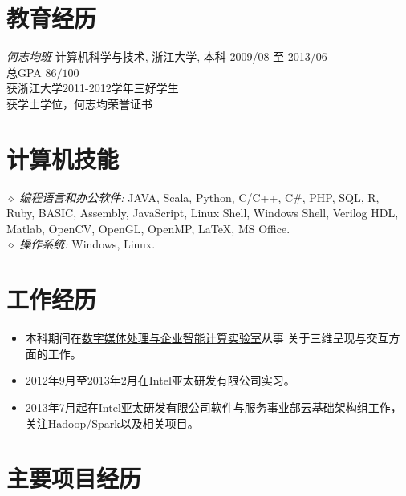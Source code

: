 \documentclass[line,margin]{res}
\begin{document}
\address{联系电话:\sl 15216861267}
\address{E-mail:\sl me@daoyuan.wang}


\begin{resume}

\section{教育经历} {\sl 何志均班} 计算机科学与技术, 浙江大学, 本科 \hfill 2009/08 至 2013/06\\
                总GPA $86/100$\\
                获浙江大学2011-2012学年三好学生\\
                获学士学位，何志均荣誉证书\\

\section{计算机技能} {$\diamond$ \sl 编程语言和办公软件:} JAVA, Scala, Python, C/C++, C\#, PHP, SQL, R, Ruby, BASIC, Assembly, JavaScript, Linux Shell, Windows Shell, Verilog HDL, Matlab, OpenCV, OpenGL, OpenMP, \LaTeX, MS Office. \\
                {$\diamond$ \sl 操作系统:} Windows, Linux.

\section{工作经历}
            \begin{itemize}
            \item 本科期间在\href{http://give.zju.edu.cn}{数字媒体处理与企业智能计算实验室}从事
                关于三维呈现与交互方面的工作。
            \item 2012年9月至2013年2月在Intel亚太研发有限公司实习。
            \item 2013年7月起在Intel亚太研发有限公司软件与服务事业部云基础架构组工作，关注Hadoop/Spark以及相关项目。
            \end{itemize}

\section{主要项目经历} 


\end{resume}
\end{document}
